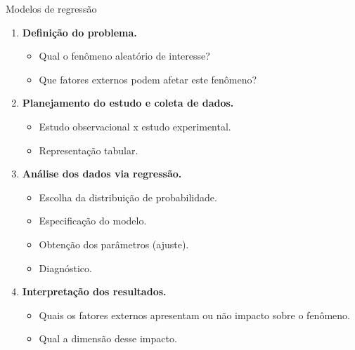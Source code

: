\documentclass[
  ignorenonframetext,
  serif,
  professionalfont,
  usenames,
  dvipsnames,
  aspectratio = 169]{beamer}
\providecommand{\tightlist}{%
  \setlength{\itemsep}{0pt}\setlength{\parskip}{0pt}}
\renewcommand{\tightlist}{%
  \setlength{\itemsep}{0\baselineskip}
  \setlength{\parskip}{0.25\baselineskip}
}
\def\endColumns{\end{minipage}}%
\def\beginAHalfColumnT{\begin{minipage}[t]{0.49\textwidth}}%
\begin{document}
\begin{frame}{Modelos de regressão}
\protect\hypertarget{modelos-de-regressuxe3o-5}{}
\beginAHalfColumnT

\begin{enumerate}
\tightlist
\item
  \textbf{Definição do problema.}

  \begin{itemize}
  \tightlist
  \item
    Qual o fenômeno aleatório de interesse?
  \item
    Que fatores externos podem afetar este fenômeno?
  \end{itemize}
\item
  \textbf{Planejamento do estudo e coleta de dados.}

  \begin{itemize}
  \tightlist
  \item
    Estudo observacional x estudo experimental.
  \item
    Representação tabular.
  \end{itemize}
\end{enumerate}

\endColumns
\beginAHalfColumnT

\begin{enumerate}
\setcounter{enumi}{2}
\tightlist
\item
  \textbf{Análise dos dados via regressão.}

  \begin{itemize}
  \tightlist
  \item
    Escolha da distribuição de probabilidade.
  \item
    Especificação do modelo.
  \item
    Obtenção dos parâmetros (ajuste).
  \item
    Diagnóstico.
  \end{itemize}
\item
  \textbf{Interpretação dos resultados.}

  \begin{itemize}
  \tightlist
  \item
    Quais os fatores externos apresentam ou não impacto sobre o
    fenômeno.
  \item
    Qual a dimensão desse impacto.
  \end{itemize}
\end{enumerate}

\endColumns
\end{frame}
\end{document}
